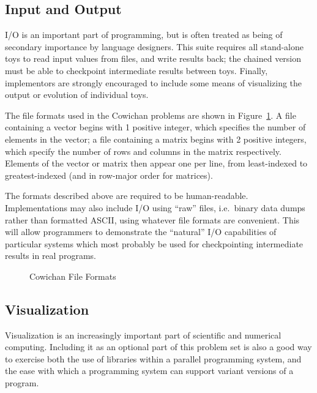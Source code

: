 \subsection{Input and Output\label{s:issues-io}}

I/O is an important part of programming,
but is often treated as being of secondary importance by language designers.
This suite requires all stand-alone toys to read input values from files, and write results back;
the chained version must be able to checkpoint intermediate results between toys.
Finally,
implementors are strongly encouraged to include some means of visualizing the output or evolution of individual toys.

The file formats used in the Cowichan problems are shown in Figure~\ref{f:io-formats}.
A file containing a vector begins with 1 positive integer,
which specifies the number of elements in the vector;
a file containing a matrix begins with 2 positive integers,
which specify the number of rows and columns in the matrix respectively.
Elements of the vector or matrix then appear one per line,
from least-indexed to greatest-indexed
(and in row-major order for matrices).

The formats described above are required to be human-readable.
Implementations may also include I/O using ``raw'' files, i.e.\ binary data dumps rather than formatted ASCII,
using whatever file formats are convenient.
This will allow programmers to demonstrate the ``natural'' I/O capabilities of particular systems
which most probably be used for checkpointing intermediate results in real programs.

\begin{figure}
\textwidth
\begin{center}\mbox{}\end{center}
\caption{Cowichan File Formats\label{f:io-formats}}
\end{figure}

\subsection{Visualization\label{s:issues-vis}}

Visualization is an increasingly important part of scientific and numerical computing.
Including it as an optional part of this problem set is also a good way to exercise both
the use of libraries within a parallel programming system,
and the ease with which a programming system can support variant versions of a program.

